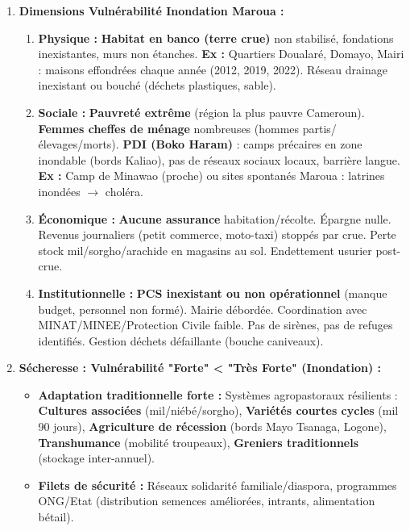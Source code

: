 \documentclass[11pt]{article}
\begin{document}
\begin{exoresolu}
\begin{enumerate}
\begin{itemize}
              \item \textbf{Vulnérabilité Très Forte :} Convergence de tous les facteurs d'aggravation (voir Q2).
          \end{itemize}
          Produit Aléa $\times$ Vulnérabilité = Maximum.
    \item \textbf{Dimensions Vulnérabilité Inondation Maroua :}
          \begin{enumerate}
              \item \textbf{Physique :} \textbf{Habitat en banco (terre crue)} non stabilisé, fondations inexistantes, murs non étanches. \textbf{Ex :} Quartiers Doualaré, Domayo, Mairi : maisons effondrées chaque année (2012, 2019, 2022). Réseau drainage inexistant ou bouché (déchets plastiques, sable).
              \item \textbf{Sociale :} \textbf{Pauvreté extrême} (région la plus pauvre Cameroun). \textbf{Femmes cheffes de ménage} nombreuses (hommes partis/élevages/morts). \textbf{PDI (Boko Haram)} : camps précaires en zone inondable (bords Kaliao), pas de réseaux sociaux locaux, barrière langue. \textbf{Ex :} Camp de Minawao (proche) ou sites spontanés Maroua : latrines inondées $\rightarrow$ choléra.
              \item \textbf{Économique :} \textbf{Aucune assurance} habitation/récolte. Épargne nulle. Revenus journaliers (petit commerce, moto-taxi) stoppés par crue. Perte stock mil/sorgho/arachide en magasins au sol. Endettement usurier post-crue.
              \item \textbf{Institutionnelle :} \textbf{PCS inexistant ou non opérationnel} (manque budget, personnel non formé). Mairie débordée. Coordination avec MINAT/MINEE/Protection Civile faible. Pas de sirènes, pas de refuges identifiés. Gestion déchets défaillante (bouche caniveaux).
          \end{enumerate}
    \item \textbf{Sécheresse : Vulnérabilité "Forte" < "Très Forte" (Inondation) :}
          \begin{itemize}
              \item \textbf{Adaptation traditionnelle forte :} Systèmes agropastoraux résilients : \textbf{Cultures associées} (mil/niébé/sorgho), \textbf{Variétés courtes cycles} (mil 90 jours), \textbf{Agriculture de récession} (bords Mayo Tsanaga, Logone), \textbf{Transhumance} (mobilité troupeaux), \textbf{Greniers traditionnels} (stockage inter-annuel).
              \item \textbf{Filets de sécurité :} Réseaux solidarité familiale/diaspora, programmes ONG/Etat (distribution semences améliorées, intrants, alimentation bétail).

\end{itemize}
\end{enumerate}
\end{exoresolu}
\end{document}
